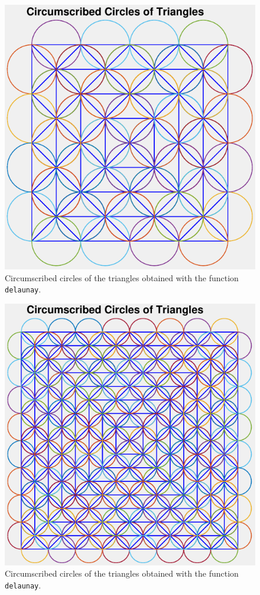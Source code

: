 \documentclass[11pt,a4paper,center,notitlepage]{article}
\numberwithin{equation}{section}
\begin{document}
\begin{figure}[H]
\centering
\includegraphics[scale=0.6]{11}
\caption{Circumscribed circles of the triangles obtained with the function \texttt{delaunay}.}
\label{fig11}
\end{figure}

\begin{figure}[H]
\centering
\includegraphics[scale=0.6]{12}
\caption{Circumscribed circles of the triangles obtained with the function \texttt{delaunay}.}
\label{fig12}
\end{figure}
\end{document}
